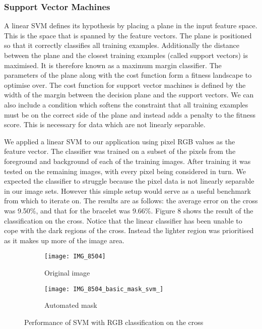 \documentclass[12pt]{IIBproject}
\begin{document}
\subsubsection{Support Vector Machines}
A linear SVM defines its hypothesis by placing a plane in the input feature space. This is the space that is spanned by the feature vectors\cite{suykens1999least}. The plane is positioned so that it correctly classifies all training examples. Additionally the distance between the plane and the closest training examples (called support vectors) is maximised. It is therefore known as a maximum margin classifier. The parameters of the plane along with the cost function form a fitness landscape to optimise over. The cost function for support vector machines is defined by the width of the margin between the decision plane and the support vectors. We can also include a condition which softens the constraint that all training examples must be on the correct side of the plane and instead adds a penalty to the fitness score. This is necessary for data which are not linearly separable. 

We applied a linear SVM to our application using pixel RGB values as the feature vector. The classifier was trained on a subset of the pixels from the foreground and background of each of the training images. After training it was tested on the remaining images, with every pixel being considered in turn. We expected the classifier to struggle because the pixel data is not linearly separable in our image sets.  However this simple setup would serve as a useful benchmark from which to iterate on. The results are as follows: the average error on the cross was 9.50\%, and that for the bracelet was 9.66\%. Figure 8 shows the result of the classification on the cross. Notice that the linear classifier has been unable to cope with the dark regions of the cross. Instead the lighter region was prioritised as it makes up more of the image area.
\begin{figure}[H]
\centering
\begin{subfigure}{.5\textwidth}
  \centering
  \texttt{[image: IMG\_8504]}
  \caption{Original image}
  \label{fig:sub1}
\end{subfigure}%
\begin{subfigure}{.5\textwidth}
  \centering
  \texttt{[image: IMG\_8504\_basic\_mask\_svm\_]}
  \caption{Automated mask}
  \label{fig:sub2}
\end{subfigure}
\caption{Performance of SVM with RGB classification on the cross}
\label{fig:test}
\end{figure}
\end{document}
